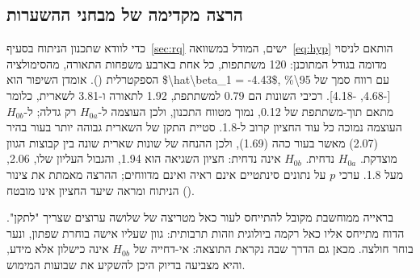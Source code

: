 \subsection{הרצה מקדימה של מבחני ההשערות}
\label{sec:pilot}
כדי לוודא שתכנון הניתוח בסעיף~\ref{sec:rq} ישים, המודל במשוואה~\eqref{eq:hyp} הותאם לניסוי מדומה בגודל המתוכנן: \num{120} משתתפות, כל אחת בארבע משפחות התאורה, מהסימולציה הספקטרלית (). אומדן השיפור הוא \num{$\hat\beta_1 = -4.43$}, עם רווח סמך של \num{95\%} \num{[-4.68, -4.18]}. רכיבי השונות הם \num{0.79} למשתתפת, \num{1.92} לתאורה ו-\num{3.81} לשארית, כלומר מתאם תוך-משתתפת של \num{0.12}, נמוך מטווח התכנון, ולכן העוצמה ל-$H_{0a}$ רק גדלה; ל-$H_{0b}$ העוצמה נמוכה כל עוד החציון קרוב ל-\num{1.8}. סטיית התקן של השארית גבוהה יותר בעור בהיר (\num{2.07}) מאשר בעור כהה (\num{1.69}), ולכן ההנחה של שונות שארית שונה בין קבוצות הגוון מוצדקת. $H_{0a}$ נדחית. $H_{0b}$ אינה נדחית: חציון השגיאה הוא \num{1.94}, והגבול העליון שלו, \num{2.06}, מעל \num{1.8}. ערכי $p$ על נתונים סינתטיים אינם ראיה ואינם מדווחים; ההרצה מאמתת את צינור הניתוח ומראה שיעד החציון אינו מובטח ().

\begin{examplebox}
בראייה ממוחשבת מקובל להתייחס לעור כאל מטריצה של שלושה ערוצים שצריך "לתקן". הדוח מתייחס אליו כאל רקמה ביולוגית וזהות תרבותית: גוון שעליו אישה בוחרת שפתון, ונער בוחר חולצה. מכאן גם הדרך שבה נקראת התוצאה: אי-דחייה של $H_{0b}$ אינה כישלון אלא מידע, והיא מצביעה בדיוק היכן להשקיע את שבועות המימוש.
\end{examplebox}
